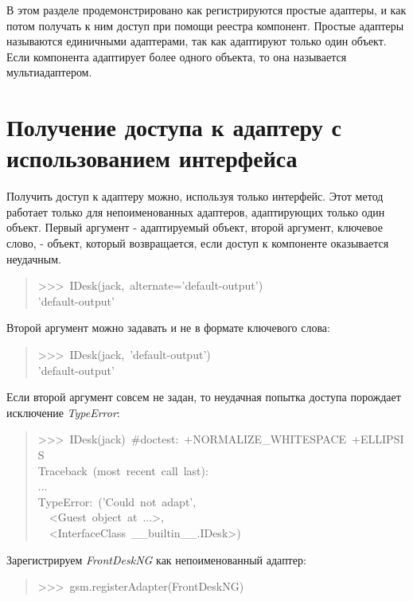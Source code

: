 \documentclass[14pt,a4paper,openany,twoside,final]{extbook}
\providecommand*{\DUroletitlereference}[1]{\textsl{#1}}
\begin{document}
В этом разделе продемонстрировано как регистрируются простые адаптеры,
и как потом получать к ним доступ при помощи реестра компонент.
Простые адаптеры называются единичными адаптерами, так как адаптируют
только один объект.  Если компонента адаптирует более одного объекта,
то она называется мультиадаптером.


\section{Получение доступа к адаптеру с использованием интерфейса%
  \label{id37}%
}

Получить доступ к адаптеру можно, используя только интерфейс.  Этот
метод работает только для непоименованных адаптеров, адаптирующих
только один объект.  Первый аргумент - адаптируемый объект, второй
аргумент, ключевое слово, - объект, который возвращается, если доступ
к компоненте оказывается неудачным.

\begin{quote}{\ttfamily \raggedright \noindent
>{}>{}>~IDesk(jack,~alternate='default-output')\\
'default-output'
}
\end{quote}

Второй аргумент можно задавать и не в формате ключевого слова:

\begin{quote}{\ttfamily \raggedright \noindent
>{}>{}>~IDesk(jack,~'default-output')\\
'default-output'
}
\end{quote}

Если второй аргумент совсем не задан, то неудачная попытка доступа
порождает исключение \DUroletitlereference{TypeError}:

\begin{quote}{\ttfamily \raggedright \noindent
>{}>{}>~IDesk(jack)~\#doctest:~+NORMALIZE\_WHITESPACE~+ELLIPSIS\\
Traceback~(most~recent~call~last):\\
...\\
TypeError:~('Could~not~adapt',\\
~~<Guest~object~at~...>,\\
~~<InterfaceClass~\_\_builtin\_\_.IDesk>)
}
\end{quote}

Зарегистрируем \DUroletitlereference{FrontDeskNG} как непоименованный адаптер:

\begin{quote}{\ttfamily \raggedright \noindent
>{}>{}>~gsm.registerAdapter(FrontDeskNG)
}
\end{quote}
\end{document}
